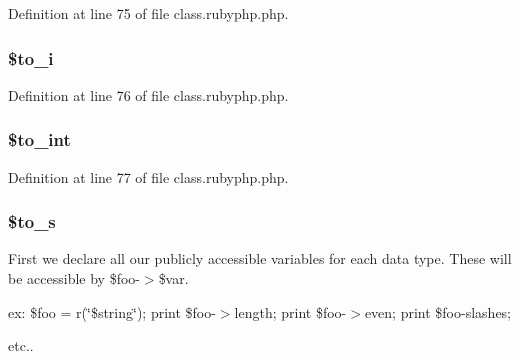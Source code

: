 Definition at line 75 of file class.\-rubyphp.\-php.

\hypertarget{class_pierce_moore_1_1_ruby_p_h_p_1_1r_afecc47a810cf510aff6387286b9c0e73}{
\subsubsection[{\$to\-\_\-i}]{\setlength{\rightskip}{0pt plus 5cm}\${\bf to\-\_\-i}}}\label{class_pierce_moore_1_1_ruby_p_h_p_1_1r_afecc47a810cf510aff6387286b9c0e73}


Definition at line 76 of file class.\-rubyphp.\-php.

\hypertarget{class_pierce_moore_1_1_ruby_p_h_p_1_1r_a41eb7bfd09e3b6ad118551accfaad638}{
\subsubsection[{\$to\-\_\-int}]{\setlength{\rightskip}{0pt plus 5cm}\${\bf to\-\_\-int}}}\label{class_pierce_moore_1_1_ruby_p_h_p_1_1r_a41eb7bfd09e3b6ad118551accfaad638}


Definition at line 77 of file class.\-rubyphp.\-php.

\hypertarget{class_pierce_moore_1_1_ruby_p_h_p_1_1r_a5469620d055732b419fff71704232d2f}{
\subsubsection[{\$to\-\_\-s}]{\setlength{\rightskip}{0pt plus 5cm}\${\bf to\-\_\-s}}}\label{class_pierce_moore_1_1_ruby_p_h_p_1_1r_a5469620d055732b419fff71704232d2f}
First we declare all our publicly accessible variables for each data type. These will be accessible by \$foo-\/$>$\$var.

ex\-: \$foo = r(\char`\"{}\$string\char`\"{}); print \$foo-\/$>$length; print \$foo-\/$>$even; print \$foo-\/slashes;

etc.. 

